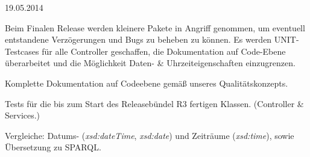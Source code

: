 \begin{release}{19.05.2014}

Beim Finalen Release werden kleinere Pakete in Angriff genommen, um eventuell entstandene Verzögerungen und Bugs zu beheben zu können. Es werden UNIT-Testcases für alle Controller geschaffen, die Dokumentation auf Code-Ebene überarbeitet und die Möglichkeit Daten- \& Uhrzeiteigenschaften einzugrenzen.

%
Komplette Dokumentation auf Codeebene gemäß unseres Qualitätskonzepts.

%
Tests für die bis zum Start des Releasebündel R3 fertigen Klassen. (Controller \& Services.)

%
Vergleiche: Datums- (\textit{xsd:dateTime}, \textit{xsd:date}) und Zeiträume (\textit{xsd:time}), sowie Übersetzung zu SPARQL.


\end{release}


